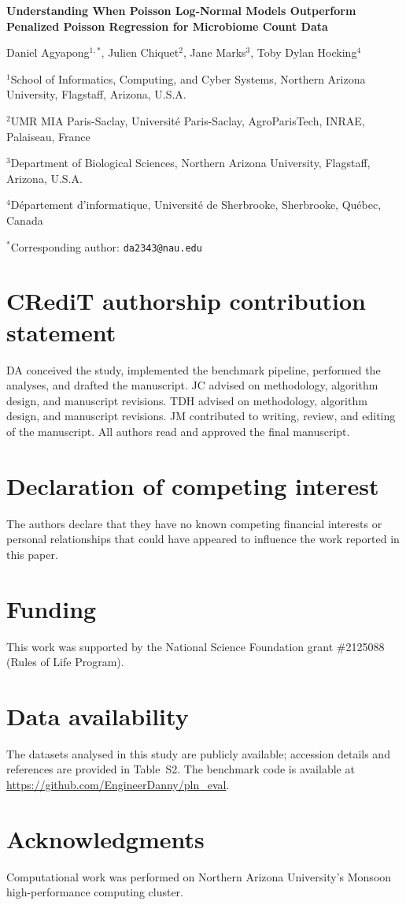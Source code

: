 \documentclass[12pt]{article}
\begin{document}
\begin{center}
{\LARGE\bfseries Understanding When Poisson Log-Normal Models Outperform Penalized Poisson Regression for Microbiome Count Data\par}
\vspace{1em}
Daniel Agyapong$^{1,*}$, Julien Chiquet$^{2}$, Jane Marks$^{3}$, Toby Dylan Hocking$^{4}$\par
\vspace{1em}
$^{1}$School of Informatics, Computing, and Cyber Systems, Northern Arizona University, Flagstaff, Arizona, U.S.A.\par
$^{2}$UMR MIA Paris-Saclay, Universit\'{e} Paris-Saclay, AgroParisTech, INRAE, Palaiseau, France\par
$^{3}$Department of Biological Sciences, Northern Arizona University, Flagstaff, Arizona, U.S.A.\par
$^{4}$D\'{e}partement d'informatique, Universit\'{e} de Sherbrooke, Sherbrooke, Qu\'{e}bec, Canada\par
\vspace{0.5em}
$^{*}$Corresponding author: \texttt{da2343@nau.edu}
\end{center}

\section*{CRediT authorship contribution statement}
DA conceived the study, implemented the benchmark pipeline, performed the analyses, and drafted the manuscript.
JC advised on methodology, algorithm design, and manuscript revisions.
TDH advised on methodology, algorithm design, and manuscript revisions.
JM contributed to writing, review, and editing of the manuscript.
All authors read and approved the final manuscript.

\section*{Declaration of competing interest}
The authors declare that they have no known competing financial interests or personal relationships that could have appeared to influence the work reported in this paper.

\section*{Funding}
This work was supported by the National Science Foundation grant \#2125088 (Rules of Life Program).

\section*{Data availability}
The datasets analysed in this study are publicly available; accession details and references are provided in Table~S2.
The benchmark code is available at \url{https://github.com/EngineerDanny/pln_eval}.

\section*{Acknowledgments}
Computational work was performed on Northern Arizona University's Monsoon high-performance computing cluster.
\end{document}
